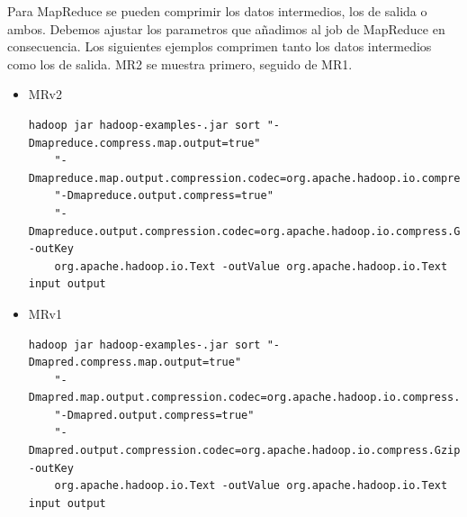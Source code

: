 \documentclass[a4paper,10pt]{article}
\begin{document}
\begin{itemize}
\clearpage

Para MapReduce se pueden comprimir los datos intermedios, los de salida o ambos. Debemos ajustar los parametros que añadimos al job de MapReduce en consecuencia. Los siguientes ejemplos comprimen tanto los datos intermedios como los de salida. MR2 se muestra primero, seguido de MR1.
  
\begin{itemize}
	\item MRv2
	
	\lstset{language=Bash, breaklines=true, basicstyle=\footnotesize}
	\begin{lstlisting}[frame=single]
	hadoop jar hadoop-examples-.jar sort "-Dmapreduce.compress.map.output=true"
	"-Dmapreduce.map.output.compression.codec=org.apache.hadoop.io.compress.GzipCodec"
	"-Dmapreduce.output.compress=true"
	"-Dmapreduce.output.compression.codec=org.apache.hadoop.io.compress.GzipCodec" -outKey
	org.apache.hadoop.io.Text -outValue org.apache.hadoop.io.Text input output
	\end{lstlisting}
	
	\item MRv1

	\lstset{language=Bash, breaklines=true, basicstyle=\footnotesize}
	\begin{lstlisting}[frame=single]
	hadoop jar hadoop-examples-.jar sort "-Dmapred.compress.map.output=true"
	"-Dmapred.map.output.compression.codec=org.apache.hadoop.io.compress.GzipCodec"
	"-Dmapred.output.compress=true"
	"-Dmapred.output.compression.codec=org.apache.hadoop.io.compress.GzipCodec" -outKey
	org.apache.hadoop.io.Text -outValue org.apache.hadoop.io.Text input output
	\end{lstlisting}
	
\end{itemize}
\end{itemize}
\end{document}
